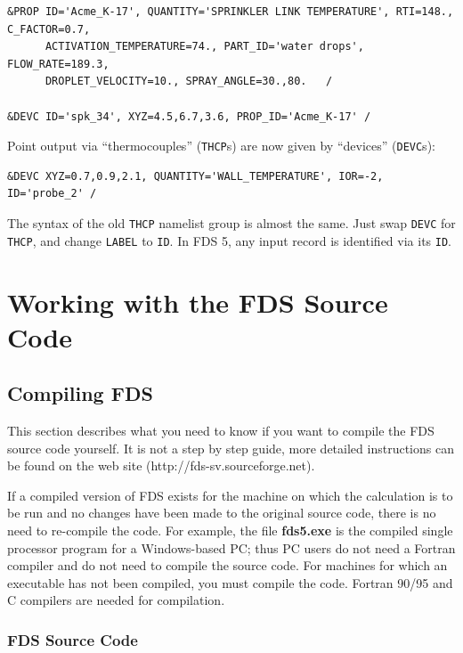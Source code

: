 \documentclass[11pt]{book}
\newcommand{\ct}{\tt\small}
\begin{document}
\footnotesize
\begin{verbatim}
&PROP ID='Acme_K-17', QUANTITY='SPRINKLER LINK TEMPERATURE', RTI=148., C_FACTOR=0.7,
      ACTIVATION_TEMPERATURE=74., PART_ID='water drops', FLOW_RATE=189.3,
      DROPLET_VELOCITY=10., SPRAY_ANGLE=30.,80.   /

&DEVC ID='spk_34', XYZ=4.5,6.7,3.6, PROP_ID='Acme_K-17' /
\end{verbatim} \normalsize

\noindent
Point output via ``thermocouples'' ({\ct THCP}s) are now given by ``devices'' ({\ct DEVC}s):

\footnotesize
\begin{verbatim}
&DEVC XYZ=0.7,0.9,2.1, QUANTITY='WALL_TEMPERATURE', IOR=-2, ID='probe_2' /
\end{verbatim}
\normalsize

\noindent
The syntax of the old {\ct THCP} namelist group is almost the same. Just swap {\ct DEVC} for {\ct THCP}, and change {\ct LABEL} to
{\ct ID}. In FDS 5, any input record is identified via its {\ct ID}.






\part{Working with the FDS Source Code}


\chapter{Compiling FDS}
\label{info:compilation}

This section describes what you need to know if you want to compile the FDS source code yourself.
It is not a step by step guide, more detailed instructions can be found on the web site (http://fds-sv.sourceforge.net).

If a compiled version of FDS exists for the machine on which the
calculation is to be run and no changes have been made to
the original source code, there is no need to re-compile the code.
For example, the file {\bf fds5.exe} is the
compiled single processor program for a Windows-based PC;
thus PC users do not need a
Fortran compiler and do not need to compile the source code.
For machines for which an executable has not been compiled, you must
compile the code. Fortran 90/95 and C compilers are needed for compilation.

\section{FDS Source Code}
\end{document}
